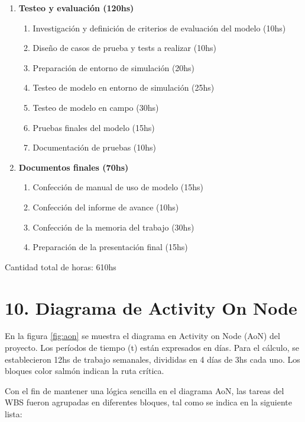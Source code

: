 \documentclass[
11pt, %
]{charter}
\begin{document}
\begin{enumerate}
\item \textbf{Testeo y evaluación (120hs)}
	\begin{enumerate}
		\item Investigación y definición de criterios de evaluación del modelo (10hs)
		\item Diseño de casos de prueba y tests a realizar (10hs)
		\item Preparación de entorno de simulación (20hs)
		\item Testeo de modelo en entorno de simulación (25hs)
		\item Testeo de modelo en campo (30hs)
		\item Pruebas finales del modelo (15hs)
		\item Documentación de pruebas (10hs)
	\end{enumerate}

\item \textbf{Documentos finales (70hs)}
	\begin{enumerate}
		\item Confección de manual de uso de modelo (15hs)
		\item Confección del informe de avance (10hs)
		\item Confección de la memoria del trabajo (30hs)
		\item Preparación de la presentación final (15hs)
	\end{enumerate}
	
\end{enumerate}


Cantidad total de horas: 610hs


\section{10. Diagrama de Activity On Node}
\label{sec:AoN}

En la figura \ref{fig:aon} se muestra el diagrama en Activity on Node (AoN) del proyecto. Los períodos de tiempo (t) están expresados en días. Para el cálculo, se establecieron 12hs de trabajo semanales, divididas en 4 días de 3hs cada uno. Los bloques color salmón indican la ruta crítica.

Con el fin de mantener una lógica sencilla en el diagrama AoN, las tareas del WBS fueron agrupadas en diferentes bloques, tal como se indica en la siguiente lista:
\end{document}

